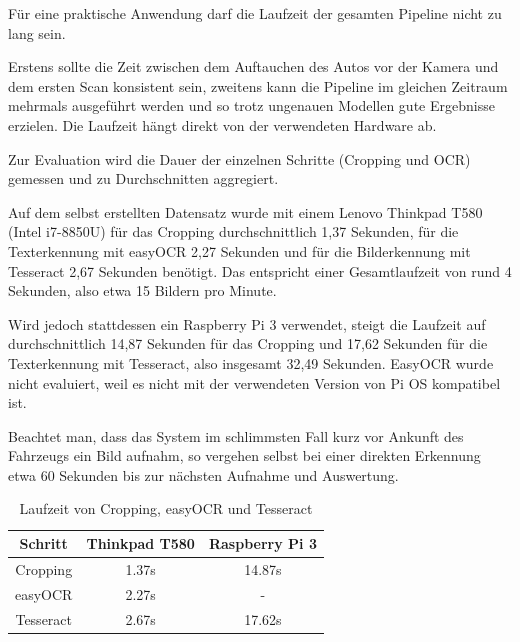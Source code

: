 Für eine praktische Anwendung darf die Laufzeit der gesamten Pipeline nicht zu lang sein.

Erstens sollte die Zeit zwischen dem Auftauchen des Autos vor der Kamera und dem ersten Scan konsistent sein,
zweitens kann die Pipeline im gleichen Zeitraum mehrmals ausgeführt werden und so trotz ungenauen Modellen gute Ergebnisse erzielen.
Die Laufzeit hängt direkt von der verwendeten Hardware ab.

Zur Evaluation wird die Dauer der einzelnen Schritte (Cropping und OCR) gemessen und zu Durchschnitten aggregiert. 

Auf dem selbst erstellten Datensatz wurde mit einem Lenovo Thinkpad T580 (Intel i7-8850U) für das Cropping durchschnittlich 1,37 Sekunden,
für die Texterkennung mit easyOCR 2,27 Sekunden und für die Bilderkennung mit Tesseract 2,67 Sekunden benötigt.
Das entspricht einer Gesamtlaufzeit von rund 4 Sekunden, also etwa 15 Bildern pro Minute.

Wird jedoch stattdessen ein Raspberry Pi 3 verwendet, steigt die Laufzeit auf durchschnittlich 14,87 Sekunden für das Cropping und 17,62 Sekunden für die Texterkennung mit Tesseract, also insgesamt 32,49 Sekunden.
EasyOCR wurde nicht evaluiert, weil es nicht mit der verwendeten Version von Pi OS kompatibel ist.

Beachtet man, dass das System im schlimmsten Fall kurz vor Ankunft des Fahrzeugs ein Bild aufnahm, so vergehen selbst bei einer direkten Erkennung etwa 60 Sekunden bis zur nächsten Aufnahme und Auswertung. 

\begin{table}[h]
	\begin{center}
	\begin{tabular}{ c | c | c }
	
	Schritt & Thinkpad T580 & Raspberry Pi 3 \\
	\hline
	Cropping & 1.37s & 14.87s \\
	easyOCR & 2.27s & - \\
	Tesseract & 2.67s & 17.62s \\
	
	\end{tabular}
	\caption{Laufzeit von Cropping, easyOCR und Tesseract}
	\label{Tabelle:2}
	\end{center}
\end{table}

